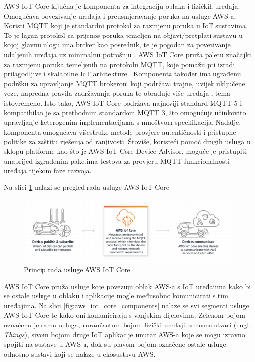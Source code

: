 AWS IoT Core ključna je komponenta za integraciju oblaka i fizičkih uređaja. Omogućava povezivanje uređaja i preusmjeravanje poruka na usluge AWS-a. Koristi MQTT koji je standardni protokol za razmjenu poruka u IoT sustavima. To je lagan  protokol za prijenos poruka temeljen na objavi/pretplati sustavu u kojoj glavnu ulogu ima broker kao posrednik, te je pogodan za povezivanje udaljenih uređaja uz minimalnu potrošnju \cite{what_is_mqtt}. AWS IoT Core pruža paletu značajki za razmjenu poruka temeljenih na protokolu MQTT, koje pomažu pri izradi prilagodljive i skalabilne IoT arhitekture \cite{aws_docs}. Komponenta također ima ugrađenu podršku za upravljanje MQTT brokerom koji podržava trajne, uvijek uključene veze, napredna pravila zadržavanja poruka te obrađuje više uređaja i tema istovremeno. Isto tako, AWS IoT Core podržava najnoviji standard MQTT 5 i kompatibilan je sa prethodnim standardom MQTT 3, što omogućuje učinkovito upravljanje heterogenim implementacijama s mnoštvom specifikacija. Nadalje, komponenta omogućava višestruke metode provjere autentičnosti i pristupne politike za zaštitu rješenja od ranjivosti. Štoviše, koristeći pomoć drugih usluga u sklopu platforme kao što je AWS IoT Core Device Advisor, moguće je pristupiti unaprijed izgrađenim paketima testova za provjeru MQTT funkcionalnosti uređaja tijekom faze razvoja.

Na slici \ref{fig:aws_iot_core_overview} nalazi se pregled rada usluge AWS IoT Core.

\begin{figure}[ht]
	\centering
	\includegraphics[scale=0.6]{imgs/aws_iot_core_overview}
	\caption{Princip rada usluge AWS IoT Core \cite{aws_docs}}
	\label{fig:aws_iot_core_overview}
\end{figure}

AWS IoT Core pruža usluge koje povezuju oblak AWS-a s IoT uređajima kako bi se ostale usluge u oblaku i aplikacije mogle međusobno komunicirati s tim uređajima. Na slici \ref{fig:aws_iot_core_components} nalaze se svi segmenti usluge AWS IoT Core te kako oni komuniciraju s vanjskim dijelovima. Zelenom bojom označena je sama usluga, narančastom bojom fizički uređaji odnosno stvari (engl. \textit{Things}), sivom bojom druge IoT aplikacije unutar AWS-a koje se mogu izravno spojiti na sustave u AWS-u, dok su plavom bojom označene ostale usluge odnosno sustavi koji se nalaze u ekosustavu AWS.

